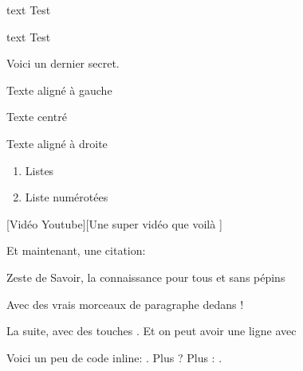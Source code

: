 \documentclass[small]{zmdocument}
\begin{document}
\begin{Spoiler}
\begin{CodeBlock}{text}
Test
\end{CodeBlock}
\end{Spoiler}

\begin{Spoiler}
\begin{CodeBlock}{text}
Test
\end{CodeBlock}
\end{Spoiler}

\begin{Spoiler}
Voici un dernier secret.
\end{Spoiler}

\begin{flushleft}
Texte aligné à gauche
\end{flushleft}

\begin{center}
Texte centré
\end{center}

\begin{flushright}
Texte aligné à droite
\end{flushright}

\begin{enumerate}
\item Listes
\item Liste numérotées
\end{enumerate}

[Vidéo Youtube][Une super vidéo que voilà ]


Et maintenant, une citation:

\begin{Quotation}[Clem]
Zeste de Savoir, la connaissance pour tous et sans pépins 

Avec des vrais morceaux de paragraphe dedans !
\end{Quotation}

La suite, avec des touches . Et on peut avoir une ligne avec

\horizontalLine

Voici un peu de code inline: . Plus ? Plus : .
\end{document}
